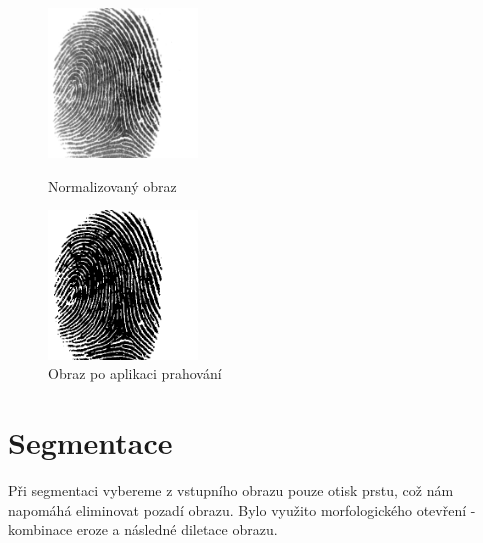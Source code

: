 \begin{figure}[htbp]
  \begin{minipage}[b]{0.5\linewidth}
    \centering
    \includegraphics[width=150]{obrazky-figures/104_7norm.png}
    \caption{Normalizovaný obraz}
    \label{fig:origimg}
  \end{minipage}
  \hspace{0.5cm}
  \begin{minipage}[b]{0.5\linewidth}
    \centering
    \includegraphics[width=150]{obrazky-figures/tresh104.png}
    \caption{Obraz po aplikaci prahování}
    \label{fig:normimg}
  \end{minipage}
\end{figure}
\section{Segmentace}
Při segmentaci vybereme z vstupního obrazu pouze otisk prstu, což nám napomáhá eliminovat pozadí obrazu. Bylo využito morfologického otevření - kombinace eroze a následné diletace obrazu.

